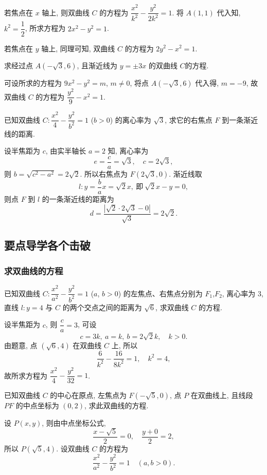     若焦点在 $x$ 轴上, 则双曲线 $C$ 的方程为 $\dfrac{x^2}{k^2}- \dfrac{y^2}{2k^2}= 1$. 将 $A(1,1)$ 代入知, $k^2= \dfrac12$, 所求方程为 $2x^2-y^2= 1$.

    若焦点在 $y$ 轴上, 同理可知, 双曲线 $C$ 的方程为 $2y^2- x^2= 1$.
\endsolution

\begin{exercise}
    求经过点 $A(-\sqrt3, 6)$, 且渐近线为 $y=\pm 3x$ 的双曲线 $C$的方程.
\end{exercise}
\beginsolution
    可设所求的方程为 $9x^2-y^2= m$, $m\neq 0$,
    将点 $A(-\sqrt3, 6)$ 代入得, $m=-9$, 故双曲线 $C$ 的方程为 $\dfrac{y^2}9- x^2= 1$.
\endsolution

\begin{exercise}
    已知双曲线 $C\colon \dfrac{x^2}4- \dfrac{y^2}{b^2}=1$ ($b>0$) 的离心率为 $\sqrt3$, 求它的右焦点 $F$ 到一条渐近线的距离.
\end{exercise}
\beginsolution
    设半焦距为 $c$, 由实半轴长 $a=2$ 知, 离心率为
    \[e= \frac{c}{a}= \sqrt3,\quad c=2\sqrt3,\]
    则 $b=\sqrt{c^2- a^2}= 2\sqrt2$. 所以右焦点为 $F(2\sqrt3,0)$. 渐近线取
    \[l\colon y= \frac{b}{a}x= \sqrt2x,\ \text{即}\ 
    \sqrt2x- y=0,\]
    则点 $F$ 到 $l$ 的一条渐近线的距离为
    \[d= \frac{|\sqrt2\cdot 2\sqrt3- 0|}{\sqrt3}= 2\sqrt2.\]
\endsolution

\subsection{要点导学\quad 各个击破}
\subsubsection{求双曲线的方程}
\begin{example}
    已知双曲线 $C\colon \dfrac{x^2}{a^2}- \dfrac{y^2}{b^2}=1$ ($a$, $b>0$) 的左焦点、右焦点分别为 $F_1$,$F_2$, 离心率为 $3$, 直线 $l\colon y=4$ 与 $C$ 的两个交点之间的距离为 $\sqrt6$, 求双曲线 $C$ 的方程.
\end{example}
\beginsolution
    设半焦距为 $c$, 则 $\dfrac{c}a= 3$, 可设
    \[c=3k,\ a=k,\ b=2\sqrt2k,\quad k>0.\]
    由题意, 点 $(\sqrt6,4)$ 在双曲线 $C$ 上, 所以
    \[\frac{6}{k^2}- \frac{16}{8k^2}= 1,\quad k^2=4,\]
    故所求方程为 $\dfrac{x^2}4- \dfrac{y^2}{32}= 1$.
\endsolution

\lianxi
\begin{exercise}[s]
    已知双曲线 $C$ 的中心在原点, 左焦点为 $F(-\sqrt5, 0)$, 点 $P$ 在双曲线上, 且线段 $PF$ 的中点坐标为 $(0, 2)$, 求此双曲线的方程.
\end{exercise}
\beginsolution
    设 $P(x,y)$, 则由中点坐标公式,
    \[\frac{x-\sqrt5}{2}= 0,\quad \frac{y+0}{2}= 2,\]
    所以 $P(\sqrt5,4)$. 设双曲线 $C$ 的方程为
    \[\dfrac{x^2}{a^2}- \dfrac{y^2}{b^2}=1\quad (a,b>0).\]

